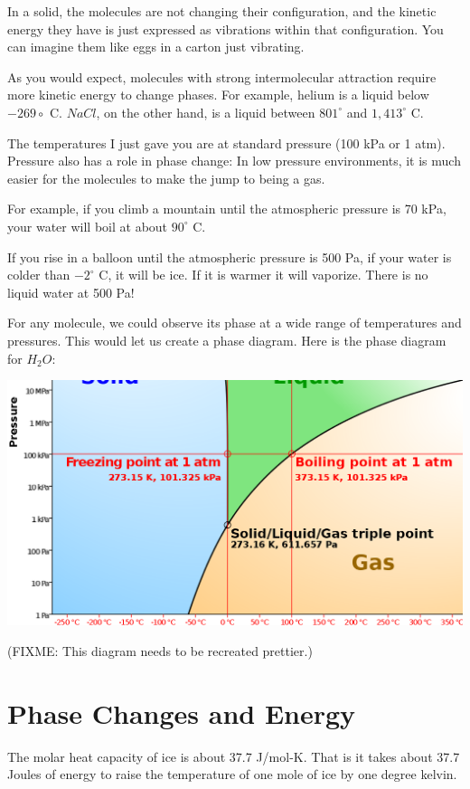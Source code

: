 In a solid, the molecules are not changing their configuration, and the kinetic energy they have is just expressed as vibrations within that configuration.   You can imagine them like eggs in a carton just vibrating.

As you would expect, molecules with strong intermolecular attraction require more kinetic energy to change phases.  For example,   helium is a liquid below $-269\circ$ C.  $NaCl$, on the other hand, is a liquid between $801^\circ$ and $1,413^\circ$ C.  

The temperatures I just gave you are at standard pressure (100 kPa or 1 atm).  Pressure also has a role in phase change:  In low pressure environments,  it is much easier for the molecules to make the jump to being a gas.

For example,  if you climb a mountain until the atmospheric pressure is 70 kPa,  your water will boil at about $90^\circ$ C.  

If you rise in a balloon until the atmospheric pressure is 500 Pa,  if your water is colder than $-2^\circ$ C,  it will be ice.  If it is warmer it will vaporize.    There is no liquid water at 500 Pa!

For any molecule,  we could observe its phase at a wide range of temperatures and pressures.  This would let us create a phase diagram.  Here is the phase diagram for $H_2O$:

\includegraphics[width=\textwidth]{waterphase_edit.png}

(FIXME: This diagram needs to be recreated prettier.)

\section{Phase Changes and Energy}

The molar heat capacity of ice is about 37.7 J/mol-K.  That is it takes about 37.7 Joules of energy to raise the temperature of one mole of ice by one degree kelvin.

